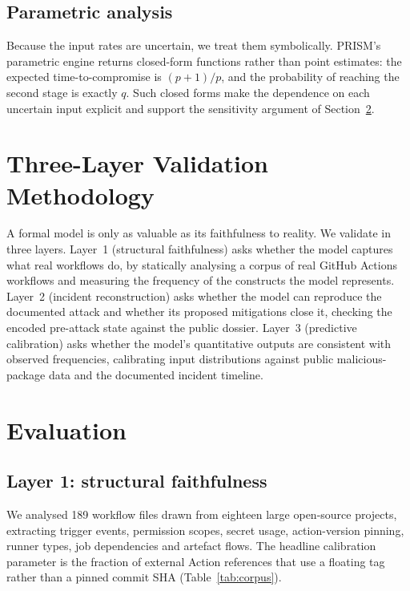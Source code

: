 \documentclass[letterpaper,twocolumn,10pt]{article}
\begin{document}
\subsection{Parametric analysis}
Because the input rates are uncertain, we treat them symbolically. PRISM's parametric engine returns closed-form functions rather than point estimates: the expected time-to-compromise is $(p{+}1)/p$, and the probability of reaching the second stage is exactly $q$. Such closed forms make the dependence on each uncertain input explicit and support the sensitivity argument of Section~\ref{sec:eval}.

\section{Three-Layer Validation Methodology}
A formal model is only as valuable as its faithfulness to reality. We validate in three layers. Layer~1 (structural faithfulness) asks whether the model captures what real workflows do, by statically analysing a corpus of real GitHub Actions workflows and measuring the frequency of the constructs the model represents. Layer~2 (incident reconstruction) asks whether the model can reproduce the documented attack and whether its proposed mitigations close it, checking the encoded pre-attack state against the public dossier. Layer~3 (predictive calibration) asks whether the model's quantitative outputs are consistent with observed frequencies, calibrating input distributions against public malicious-package data and the documented incident timeline.

\section{Evaluation}\label{sec:eval}
\subsection{Layer 1: structural faithfulness}
We analysed 189 workflow files drawn from eighteen large open-source projects, extracting trigger events, permission scopes, secret usage, action-version pinning, runner types, job dependencies and artefact flows. The headline calibration parameter is the fraction of external Action references that use a floating tag rather than a pinned commit SHA (Table~\ref{tab:corpus}).
\end{document}
